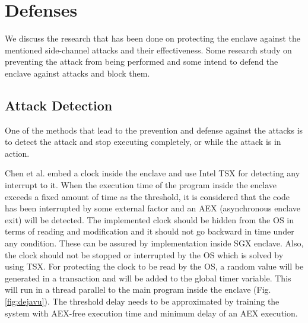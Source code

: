 \section{Defenses}
We discuss the research that has been done on protecting the enclave against the mentioned side-channel attacks and their effectiveness. Some research study on preventing the attack from being performed and some intend to defend the enclave against attacks and block them.

\subsection{Attack Detection}%
One of the methods that lead to the prevention and defense against the attacks is to detect the attack and stop executing completely, or while the attack is in action.

Chen et al. \cite{dejavu} embed a clock inside the enclave and use Intel TSX for detecting any interrupt to it. When the execution time of the program inside the enclave exceeds a fixed amount of time as the threshold, it is considered that the code has been interrupted by some external factor and an AEX (asynchronous enclave exit) will be detected. The implemented clock should be hidden from the OS in terms of reading and modification and it should not go backward in time under any condition. These can be assured by implementation inside SGX enclave. Also, the clock should not be stopped or interrupted by the OS which is solved by using TSX. For protecting the clock to be read by the OS, a random value will be generated in a transaction and will be added to the global timer variable. This will run in a thread parallel to the main program inside the enclave (Fig. \ref{fig:dejavu}). The threshold delay needs to be approximated by training the system with AEX-free execution time and minimum delay of an AEX execution.

